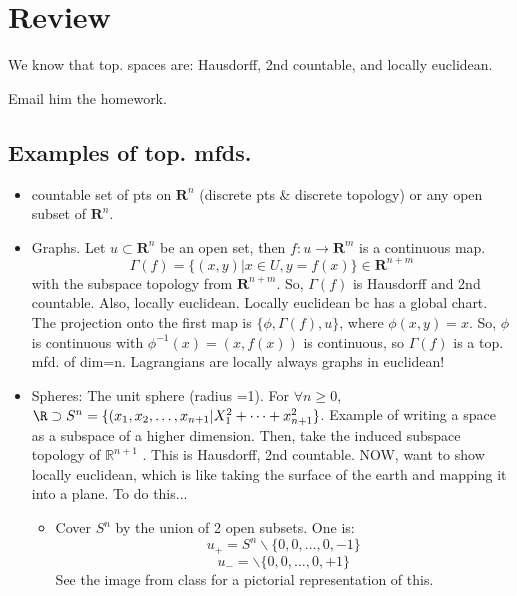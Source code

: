 \documentclass[12pt,letterpaper]{article}
\begin{document}
\section*{Review}
We know that top. spaces are: Hausdorff, 2nd countable, and locally euclidean.

Email him the homework. 

\subsection{Examples of top. mfds.}
\begin{itemize}
    \item countable set of pts on $\mathbf{R}^n$ (discrete pts & discrete topology) or any open subset of $\mathbf{R}^n$.
    \item Graphs. Let $ u\subset \mathbf{R}^n$ be an open set, then $f: u \rightarrow \mathbf{R}^m$ is a continuous map.
    \begin{equation}
        \Gamma(f) = \{ (x,y) | x \in U, y = f(x) \} \in \mathbf{R}^{n+m}
    \end{equation}
    with the subspace topology from $\mathbf{R}^{n+m}$. So, $\Gamma(f) $ is Hausdorff and 2nd countable. Also, locally euclidean. Locally euclidean bc has a global chart. The projection onto the first map is $\{ \phi, \Gamma(f), u \}$, where $\phi(x,y) = x$. So, $\phi$ is continuous with $\phi^{-1}(x) = (x, f(x))$ is continuous, so $\Gamma(f)$ is a top. mfd. of dim=n. Lagrangians are locally always graphs in euclidean!
    \item Spheres: The unit sphere (radius =1). For $\forall n \geq 0$, $\R \supset S^n = \{ (x_1, x_2, \dots , x_{n+1} | X_1^2 + \dots + x_{n+1}^2 \}$. Example of writing a space as a subspace of a higher dimension. Then, take the induced subspace topology of $\mathbb{R}^{n+1}$ . This is Hausdorff, 2nd countable. NOW, want to show locally euclidean, which is like taking the surface of the earth and mapping it into a plane. To do this...
    \begin{itemize}
        \item Cover $S^n$ by the union of 2 open subsets. One is:
        \begin{equation}
            u_+ = S^n \backslash \{ 0,0, \dots, 0, -1\}
        \end{equation}
        \begin{equation}
            u_- = \backslash \{ 0,0, \dots, 0, +1\}
        \end{equation}
        See the image from class for a pictorial representation of this. 

\end{itemize}
\end{itemize}
\end{document}
